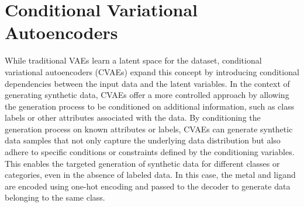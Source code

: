 \section{Conditional Variational Autoencoders}
While traditional VAEs learn a latent space for the dataset, conditional variational autoencoders (CVAEs) expand this concept by introducing conditional dependencies between the input data and the latent variables. In the context of generating synthetic data, CVAEs offer a more controlled approach by allowing the generation process to be conditioned on additional information, such as class labels or other attributes associated with the data.
By conditioning the generation process on known attributes or labels, CVAEs can generate synthetic data samples that not only capture the underlying data distribution but also adhere to specific conditions or constraints defined by the conditioning variables. This enables the targeted generation of synthetic data for different classes or categories, even in the absence of labeled data. In this case, the metal and ligand are encoded using one-hot encoding and passed to the decoder to generate data belonging to the same class. 
